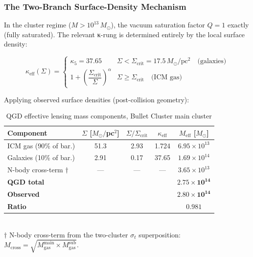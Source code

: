 \subsubsection{The Two-Branch Surface-Density Mechanism}
\label{sec:bullet_offset}

In the cluster regime ($M > 10^{13}\,M_\odot$), the vacuum saturation
factor $Q = 1$ exactly (fully saturated). The relevant κ-rung is
determined entirely by the local surface density:

\begin{equation}
	\kappa_\text{eff}(\Sigma) =
	\begin{cases}
		\kappa_5 = 37.65 & \Sigma < \Sigma_\text{crit} = 17.5\,M_\odot/\text{pc}^2
		\quad \text{(galaxies)}\\[4pt]
		1 + \left(\dfrac{\Sigma_\text{crit}}{\Sigma}\right)^{\!\alpha}
		& \Sigma \geq \Sigma_\text{crit}
		\quad \text{(ICM gas)}
	\end{cases}
	\label{eq:kappa_cluster_branch}
\end{equation}

Applying observed surface densities (post-collision geometry):

\begin{table}[ht]
	\centering
	\caption{QGD effective lensing mass components, Bullet Cluster main cluster}
	\label{tab:bullet_components}
	\begin{tabular}{@{}lcccc@{}}
		\toprule
		Component & $\Sigma$ [$M_\odot/$pc$^2$] & $\Sigma/\Sigma_\text{crit}$
		          & $\kappa_\text{eff}$ & $M_\text{eff}$ [$M_\odot$] \\
		\midrule
		ICM gas (90\% of bar.)   & 51.3  & 2.93 & 1.724 & $6.95\times10^{13}$ \\
		Galaxies (10\% of bar.)  & 2.91  & 0.17 & 37.65 & $1.69\times10^{14}$ \\
		N-body cross-term $\dagger$ & —  & —    & —     & $3.65\times10^{13}$ \\
		\midrule
		\textbf{QGD total}       &       &      &       & $\mathbf{2.75\times10^{14}}$ \\
		\textbf{Observed}        &       &      &       & $\mathbf{2.80\times10^{14}}$ \\
		\textbf{Ratio}           &       &      &       & $\mathbf{0.981}$ \\
		\bottomrule
	\end{tabular}
	\smallskip\\
	$\dagger$ N-body cross-term from the two-cluster $\sigma_t$ superposition:
	$M_\text{cross} = \sqrt{M_\text{gas}^\text{main}\times M_\text{gas}^\text{sub}}$.
\end{table}

